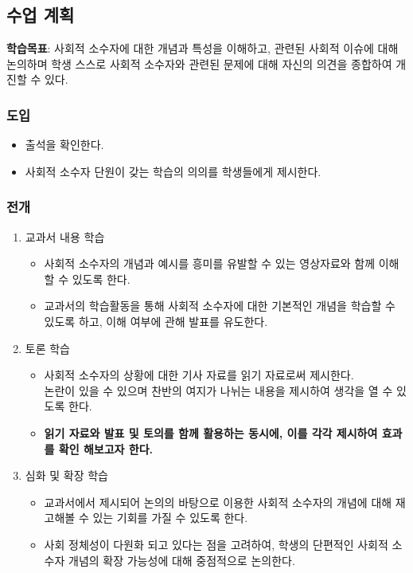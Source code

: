 \documentclass[10pt, a4paper]{oblivoir}
\begin{document}
        \subsection{수업 계획}
        \textbf{학습목표}: 사회적 소수자에 대한 개념과 특성을 이해하고, 관련된 사회적 이슈에 대해 논의하며 학생 스스로 
        사회적 소수자와 관련된 문제에 대해 자신의 의견을 종합하여 개진할 수 있다. 
            \subsubsection{도입}
            \begin{itemize}[-]
                \item 출석을 확인한다.
                \item 사회적 소수자 단원이 갖는 학습의 의의를 학생들에게 제시한다.
            \end{itemize}
            \subsubsection{전개}
            \begin{enumerate}
                \item 교과서 내용 학습
                \begin{itemize}[-]
                    \item 사회적 소수자의 개념과 예시를 흥미를 유발할 수 있는 영상자료와 함께 이해할 수 있도록 한다. 
                    \item 교과서의 학습활동을 통해 사회적 소수자에 대한 기본적인 개념을 학습할 수 있도록 하고, 이해 여부에 관해 발표를 유도한다.
                \end{itemize}
                \item 토론 학습
                \begin{itemize}[-]
                    \item 사회적 소수자의 상황에 대한 기사 자료를 읽기 자료로써 제시한다. \\ 논란이 있을 수 있으며 찬반의 여지가 나뉘는 내용을 제시하여 생각을 열 수 있도록 한다. 
                    \item \textbf{읽기 자료와 발표 및 토의를 함께 활용하는 동시에, 이를 각각 제시하여 효과를 확인 해보고자 한다.}
                \end{itemize}
                \item 심화 및 확장 학습
                \begin{itemize}[-]
                    \item 교과서에서 제시되어 논의의 바탕으로 이용한 사회적 소수자의 개념에 대해 재고해볼 수 있는 기회를 가질 수 있도록 한다. 
                    \item 사회 정체성이 다원화 되고 있다는 점을 고려하여, 학생의 단편적인 사회적 소수자 개념의 확장 가능성에 대해 중점적으로 논의한다. 
                \end{itemize}
            \end{enumerate}
\end{document}
